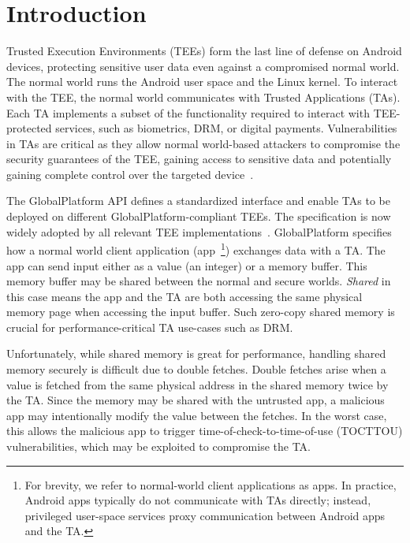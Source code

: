 \documentclass[conference]{IEEEtran}
\begin{document}
\section{Introduction}\label{sec:introduction}

Trusted Execution Environments (TEEs) form the last line of defense on 
Android devices, protecting sensitive user data even against a 
compromised normal world. The normal world runs the Android user space and the 
Linux kernel. To interact with the TEE, the normal world communicates with 
Trusted Applications (TAs). Each TA implements a subset of the functionality 
required to interact with TEE-protected services, such as biometrics, DRM, or 
digital payments. Vulnerabilities in TAs are critical as they allow normal 
world-based attackers to compromise the security guarantees of the TEE, 
gaining access to sensitive data and potentially gaining complete control over 
the targeted device~\cite{beniaini2017trustissues,
berard2018kinibi,busch2020finding,rollback,globalconfusion,Komaromy2021UnboxYourPhone,
Li2024DiveIntoAndroidTA,AdamskiGuilbonPeterlin2019SamsungTrustZone,
Makkaveev2019TrustZoneFuzzing,AdamTC}. 

The GlobalPlatform API defines a standardized interface and enable TAs to be deployed on 
different GlobalPlatform-compliant TEEs. The specification is now widely adopted by all  
relevant TEE implementations~\cite{globalconfusion}. GlobalPlatform specifies how a normal 
world client application (app~\footnote{For brevity, we refer to normal-world client applications 
as apps. In practice, Android apps typically do not communicate with TAs directly; instead, 
privileged user-space services proxy communication between Android apps and the TA.}) 
exchanges data with a TA. The app can send input either as a value (an 
integer) or a memory buffer. This memory buffer may be shared between the 
normal and secure worlds. \textit{Shared} in this case means the app and the TA are both 
accessing the same physical memory page when accessing the input buffer. Such zero-copy 
shared memory is crucial for performance-critical TA use-cases such as DRM.

Unfortunately, while shared memory is great for performance, handling shared 
memory securely is difficult due to double fetches. Double fetches arise when 
a value is fetched from the same physical address in the shared memory twice by the TA. 
Since the memory may be shared with the untrusted app, a malicious app may intentionally 
modify the value between the fetches. 
In the worst case, this allows the malicious app to trigger time-of-check-to-time-of-use (TOCTTOU) 
vulnerabilities, which may be exploited to compromise the TA.
\end{document}
